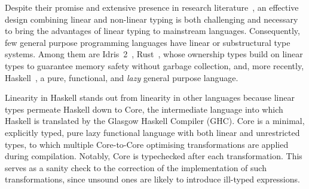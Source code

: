 \documentclass[acmsmall,review,screen]{acmart}
\newcommand{\ROUNDTWO}[1]{{\color{red}#1}}
\begin{document}
Despite their promise and extensive presence in research
literature~\cite{Wadler1990LinearTC,CERVESATO2000133,10.1093/logcom/2.3.297},
an effective design combining linear and non-linear typing is both
challenging and necessary to bring the advantages of linear typing to
mainstream languages.
%
Consequently, few general purpose programming languages have linear or substructural
type systems. Among them are Idris~2~\cite{brady:LIPIcs.ECOOP.2021.9},
Rust~\cite{10.1145/2692956.2663188}, whose
ownership types build on linear types to guarantee memory safety
without garbage collection, and, more recently,
Haskell~\cite{cite:linearhaskell}, a pure, functional, and
\emph{lazy} general purpose language.
%
%

Linearity in Haskell stands out from linearity in other languages because
linear types permeate Haskell down to Core, the intermediate language into
which Haskell is translated by the Glasgow Haskell Compiler (GHC).
%
Core is a minimal, explicitly typed, \ROUNDTWO{pure} lazy functional language with both
linear and unrestricted types, to which multiple Core-to-Core optimising
transformations are applied during compilation.
%
Notably, Core \ROUNDTWO{is typechecked after each transformation}. This serves
as a sanity check to the correction of \ROUNDTWO{the implementation} of
\ROUNDTWO{such} transformations, since unsound ones are likely to introduce
ill-typed expressions. %
%
%

\end{document}
